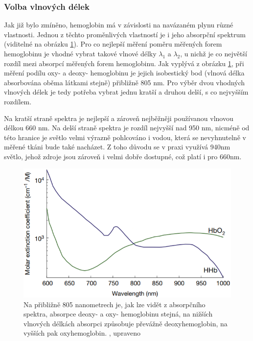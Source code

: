 \subsubsection{Volba vlnových délek}
Jak již bylo zmíněno, hemoglobin má v závislosti na navázaném plynu různé vlastnosti. Jednou z těchto proměnlivých vlastností je i jeho absorpční spektrum (viditelné na obrázku \ref{fig:Absorpce}). Pro co nejlepší měření poměru měřených forem hemoglobinu je vhodné vybrat takové vlnové délky $\lambda_1$ a $\lambda_2$, u nichž je co největší rozdíl mezi absorpcí měřených forem hemoglobinu. Jak vyplývá z obrázku \ref{fig:Absorpce}, při měření podílu oxy- a deoxy- hemoglobinu je jejich isobestický bod (vlnová délka absorbována oběma látkami stejně) přibližně 805 nm. Pro výběr dvou vhodných vlnových délek je tedy potřeba vybrat jednu kratší a druhou delší, s co nejvyšším rozdílem.
\par Na kratší straně spektra je nejlepší a zároveň nejběžněji používanou vlnovou délkou 660 nm. Na delší straně spektra je rozdíl nejvyšší nad 950 nm, nicméně od této hranice je světlo velmi výrazně pohlcováno i vodou, která se nevyhnutelně v měřené tkáni bude také nacházet. Z toho důvodu se v praxi využívá 940nm světlo, jehož zdroje jsou zároveň i velmi dobře dostupné, což platí i pro 660nm. \citep{KYRIACOU}
\begin{figure}[ht]
  \includegraphics[scale=1, center]{Kapitoly/Teoreticka/Obrazky/Absorpce.png}
  \caption [Absorpční spektrum Hb a Hb$O_2$]{Na přibližně 805 nanometrech je, jak lze vidět z absorpčního spektra, absorpce deoxy- a oxy- hemoglobinu stejná, na nižších vlnových délkách absorpci způsobuje převážně deoxyhemoglobin, na vyšších pak oxyhemoglobin. \citep{KYRIACOU}, upraveno}
  \label{fig:Absorpce}
\end{figure}

